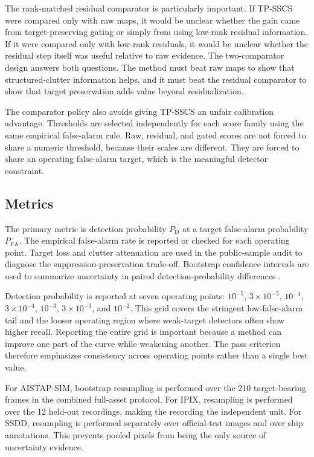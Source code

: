 \documentclass[journal]{IEEEtran}
\begin{document}
The rank-matched residual comparator is particularly important. If TP-SSCS were compared only with raw maps, it would be unclear whether the gain came from target-preserving gating or simply from using low-rank residual information. If it were compared only with low-rank residuals, it would be unclear whether the residual step itself was useful relative to raw evidence. The two-comparator design answers both questions. The method must beat raw maps to show that structured-clutter information helps, and it must beat the residual comparator to show that target preservation adds value beyond residualization.

The comparator policy also avoids giving TP-SSCS an unfair calibration advantage. Thresholds are selected independently for each score family using the same empirical false-alarm rule. Raw, residual, and gated scores are not forced to share a numeric threshold, because their scales are different. They are forced to share an operating false-alarm target, which is the meaningful detector constraint.

\subsection{Metrics}

The primary metric is detection probability $P_{\mathrm{D}}$ at a target false-alarm probability $P_{\mathrm{FA}}$. The empirical false-alarm rate is reported or checked for each operating point. Target loss and clutter attenuation are used in the public-sample audit to diagnose the suppression-preservation trade-off. Bootstrap confidence intervals are used to summarize uncertainty in paired detection-probability differences \cite{efron1979bootstrap}.

Detection probability is reported at seven operating points: $10^{-5}$, $3\times10^{-5}$, $10^{-4}$, $3\times10^{-4}$, $10^{-3}$, $3\times10^{-3}$, and $10^{-2}$. This grid covers the stringent low-false-alarm tail and the looser operating region where weak-target detectors often show higher recall. Reporting the entire grid is important because a method can improve one part of the curve while weakening another. The pass criterion therefore emphasizes consistency across operating points rather than a single best value.

For AISTAP-SIM, bootstrap resampling is performed over the 210 target-bearing frames in the combined full-asset protocol. For IPIX, resampling is performed over the 12 held-out recordings, making the recording the independent unit. For SSDD, resampling is performed separately over official-test images and over ship annotations. This prevents pooled pixels from being the only source of uncertainty evidence.
\end{document}
